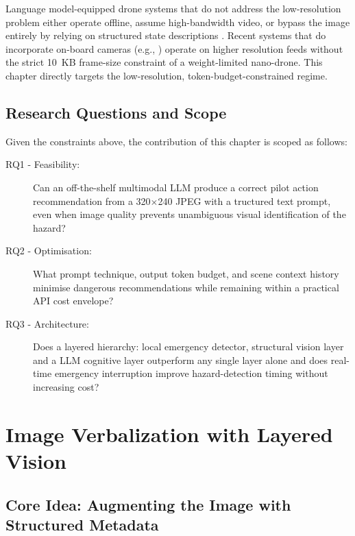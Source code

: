 Language model-equipped drone systems that do not address the low-resolution problem either operate offline, assume high-bandwidth video, or bypass the image entirely by relying on structured state descriptions \cite{ahn2022saycan, huang2022innermonologue}. 
Recent systems that do incorporate on-board cameras (e.g., \cite{rescuedrone2025, hierarchicaldrone2025}) operate on higher
resolution feeds without the strict 10~KB frame-size constraint of a
weight-limited nano-drone. 
This chapter directly targets the low-resolution, token-budget-constrained regime.
\newpage
\subsection{Research Questions and Scope}
\label{sec:ch2_problem_rq}

Given the constraints above, the contribution of this chapter is scoped as follows:

\begin{description}
  \item[RQ1 - Feasibility:] Can an off-the-shelf multimodal LLM produce a correct pilot action recommendation from a 320$\times$240 JPEG with a tructured text prompt, even when image quality prevents unambiguous visual identification of the hazard?
  \item[RQ2 - Optimisation:] What prompt technique, output token budget, and scene context history minimise dangerous recommendations while remaining within a practical API cost envelope?
  \item[RQ3 - Architecture:] Does a layered hierarchy: local emergency detector, structural vision layer and a LLM cognitive layer outperform any single layer alone and does real-time emergency interruption improve hazard-detection timing without increasing cost?
\end{description}


\section{Image Verbalization with Layered Vision}
\label{sec:ch2_proposed}

\subsection{Core Idea: Augmenting the Image with Structured Metadata}
\label{sec:ch2_proposed_idea}

